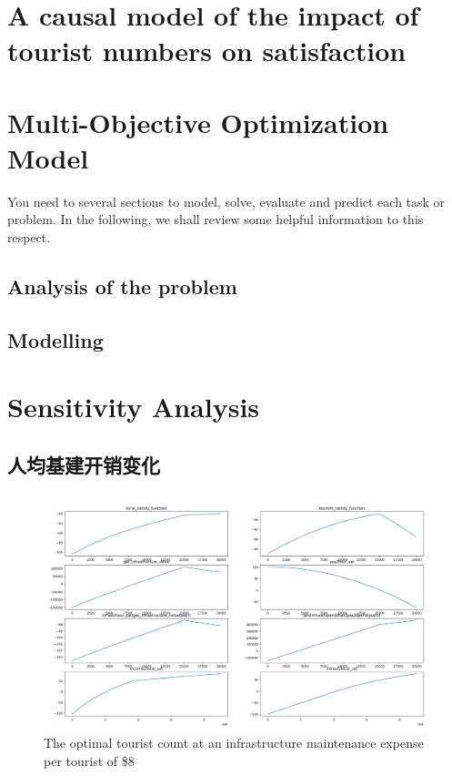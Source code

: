 \documentclass[12pt]{article}  %
\begin{document}
 \section{A causal model of the impact of tourist numbers on satisfaction}
 \section{Multi-Objective Optimization Model}
 
 You need to several sections to model, solve, evaluate and predict each task or problem. In the following, we shall review some helpful information to this respect.
 
 \subsection{Analysis of the problem}
 
 \subsection{Modelling}
 
 

 \section{Sensitivity Analysis}
 \subsection{人均基建开销变化}
 
 
 \begin{figure}[H]  %
 
 \centering  %
 \includegraphics[width=.9\textwidth]{sensitivity12.png} %
 \caption{The optimal tourist count at an infrastructure maintenance expense per tourist of \$8} %
 \label{figx}%
 \end{figure}
\end{document}

